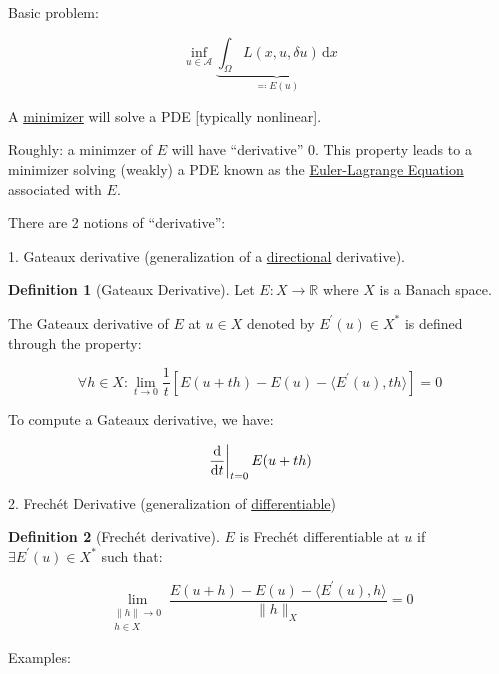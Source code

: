 \documentclass{article}
\theoremstyle{definition}
\newtheorem{definition}{Definition}
\begin{document}
Basic problem:

\[
    \inf_{u\in \mathcal{A}} \underbrace{\int_{\Omega} L(x, u, \delta u) \,\mathrm{d}x}_{\eqqcolon E(u)}
\]

A \underline{minimizer} will solve a PDE [typically nonlinear].

Roughly: a minimzer of \(E\) will have ``derivative'' \(0\). This property leads to a minimizer solving (weakly) a PDE known as the \underline{Euler-Lagrange Equation} associated with \(E\).

There are 2 notions of ``derivative'':

1. Gateaux derivative (generalization of a \underline{directional} derivative).

\begin{definition}
    [Gateaux Derivative] Let \(E: X \to \mathbb{R}\) where \(X\) is a Banach space.

    The Gateaux derivative of \(E\) at \(u\in X\) denoted by \(E^{\prime} (u) \in X^{\ast}\) is defined through the property:

    \[
        \forall h\in X: \lim_{t \to 0} \frac{1}{t} \left[ E(u+th) - E(u) - \langle E^{\prime} (u), th \rangle \right] = 0
    \]
\end{definition}

To compute a Gateaux derivative, we have:

\[
    \eval{\frac{\mathrm{d}}{\mathrm{d}t}}_{t=0} E(u+th) 
\]

2. Frech\'et Derivative (generalization of \underline{differentiable})

\begin{definition}
    [Frech\'et derivative] \(E\) is Frech\'et differentiable at \(u\) if \(\exists E^{\prime} (u)\in X^{\ast}\) such that:

    \[
        \lim_{\substack{\lVert h \rVert \to 0 \\ h\in X}} \frac{E(u+h) - E(u) - \langle E^{\prime}(u),h \rangle}{\lVert h \rVert _X} = 0
    \]
\end{definition}

Examples:
\end{document}
